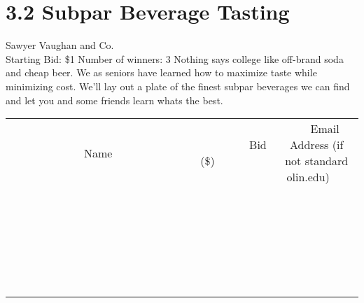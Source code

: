 \documentclass[11pt]{article}
\begin{document}
\section*{3.2 Subpar Beverage Tasting}
Sawyer Vaughan and Co.
\\
Starting Bid: \$1
\newline
Number of winners: 3
\newline
Nothing says college like off-brand soda and cheap beer. We as seniors have learned how to maximize taste while minimizing cost. We'll lay out a plate of the finest subpar beverages we can find and let you and some friends learn whats the best.
\\[6ex]
\begin{tabular}{c c c}
~~~~~~~~~~~~~Name~~~~~~~~~~~~~ & ~~~~~~~~~Bid (\$)~~~~~~~~~  & ~~~Email Address (if not standard olin.edu)~~~\\
 & & \\
\hline
 & & \\
\hline
 & & \\
\hline
 & & \\
\hline
 & & \\
\hline
 & & \\
\hline
 & & \\
\hline
 & & \\
\hline
 & & \\
\hline
 & & \\
\hline
 & & \\
\hline
 & & \\
\hline
 & & \\
\hline
 & & \\
\hline
 & & \\
\hline
 & & \\
\hline
 & & \\
\hline
 & & \\
\hline
 & & \\
\hline
 & & \\
\hline
 & & \\
\hline
 & & \\
\hline
 & & \\
\hline
 & & \\
\hline
 & & \\
\hline
 & & \\
\hline
\end{tabular}
\newpage
\end{document}
